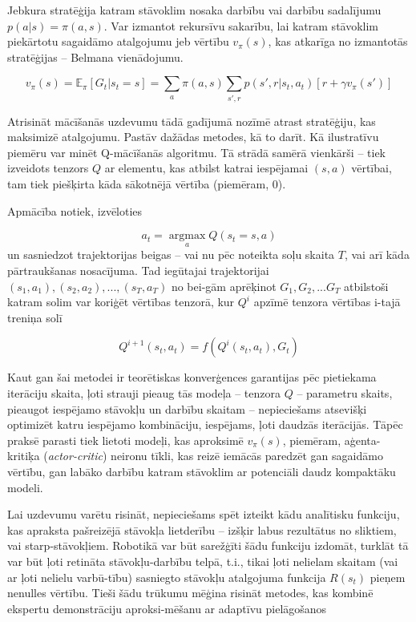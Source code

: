\documentclass[12pt, a4paper]{article}
\numberwithin{equation}{section} %
\begin{document}
Jebkura stratēģija katram stāvoklim nosaka darbību vai darbību sadalījumu $p(a \vert s) = \pi(a,s)$. Var izmantot rekursīvu sakarību, lai katram stāvoklim piekārtotu sagaidāmo atalgojumu jeb vērtību $v_{\pi}(s)$, kas atkarīga no izmantotās stratēģijas -- Belmana vienādojumu.

\begin{equation}
    v_{\pi}(s) = \mathbb{E}_{\pi}[G_t \vert s_t = s] = \sum_{a}\pi(a,s)\sum_{s', r}p(s', r \vert s_t, a_t)[r + \gamma v_{\pi}(s')]
\end{equation}

Atrisināt mācīšanās uzdevumu tādā gadījumā nozīmē atrast stratēģiju, kas maksimizē atalgojumu. Pastāv dažādas metodes, kā to darīt. Kā ilustratīvu piemēru var minēt Q-mācīšanās algoritmu. Tā strādā samērā vienkārši -- tiek izveidots tenzors $Q$ ar elementu, kas atbilst katrai iespējamai $(s,a)$ vērtībai, tam tiek piešķirta kāda sākotnējā vērtība (piemēram, 0). 

Apmācība notiek, izvēloties

\begin{equation}
    a_t = \operatorname*{argmax}_a Q(s_t = s, a)
\end{equation}
un sasniedzot trajektorijas beigas -- vai nu pēc noteikta soļu skaita $T$, vai arī kāda pārtraukšanas nosacījuma. Tad iegūtajai trajektorijai $(s_1, a_1), (s_2, a_2), ..., (s_T, a_T)$ no bei-gām aprēķinot $G_1, G_2, ... G_T$ atbilstoši katram solim var koriģēt vērtības tenzorā, kur $Q^i$ apzīmē tenzora vērtības i-tajā treniņa solī

\begin{equation}
    Q^{i+1}(s_t,a_t)=f(Q^{i}(s_t, a_t), G_t)
\end{equation}

Kaut gan šai metodei ir teorētiskas konverģences garantijas pēc pietiekama iterāciju skaita, ļoti strauji pieaug tās modeļa -- tenzora $Q$ -- parametru skaits, pieaugot iespējamo stāvokļu un darbību skaitam -- nepieciešams atsevišķi optimizēt katru iespējamo kombināciju, iespējams, ļoti daudzās iterācijās. Tāpēc praksē parasti tiek lietoti modeļi, kas aproksimē $v_{\pi}(s)$, piemēram, aģenta-kritiķa (\textit{actor-critic}) neironu tīkli, kas reizē iemācās paredzēt gan sagaidāmo vērtību, gan labāko darbību katram stāvoklim ar potenciāli daudz kompaktāku modeli.

Lai uzdevumu varētu risināt, nepieciešams spēt izteikt kādu analītisku funkciju, kas apraksta pašreizējā stāvokļa lietderību -- izšķir labus rezultātus no sliktiem, vai starp-stāvokļiem. Robotikā var būt sarežģīti šādu funkciju izdomāt, turklāt tā var būt ļoti retināta stāvokļu-darbību telpā, t.i., tikai ļoti nelielam skaitam (vai ar ļoti nelielu varbū-tību) sasniegto stāvokļu atalgojuma funkcija $R(s_t)$ pieņem nenulles vērtību. Tieši šādu trūkumu mēģina risināt metodes, kas kombinē ekspertu demonstrāciju aproksi-mēšanu ar adaptīvu pielāgošanos \cite{nair2018overcoming}
\end{document}
